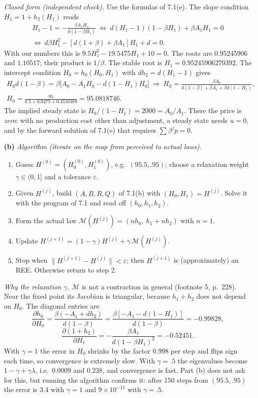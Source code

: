\documentclass[12pt, letterpaper]{article}
\begin{document}
\begin{tcolorbox}[evenbox,title={Exercise 7.2 \quad Rational expectations}]
\emph{Closed form (independent check).} Use the formulas of 7.1(e). The slope condition
$H_1=1+h_2(H_1)$ reads
\[
\begin{gathered}
H_1-1=-\frac{\beta A_1H_1}{d(1-\beta H_1)}
\ \Longleftrightarrow\ d(H_1-1)(1-\beta H_1)+\beta A_1H_1=0\\
\Longleftrightarrow\ d\beta H_1^2-[d(1+\beta)+\beta A_1]H_1+d=0 .
\end{gathered}
\]
With our numbers this is $9.5H_1^2-19.5475H_1+10=0$. The roots are $0.95245906$ and $1.10517$;
their product is $1/\beta$. The stable root is $H_1=0.95245906270392$. The intercept condition
$H_0=h_0(H_0,H_1)$ with $dh_2=d(H_1-1)$ gives
\[
\begin{gathered}
H_0d(1-\beta)=\beta\big[A_0-A_1H_0-d(1-H_1)H_0\big]
\ \Longrightarrow\
H_0=\frac{\beta A_0}{d(1-\beta)+\beta A_1+\beta d(1-H_1)},\\
H_0=\frac{95}{0.5+0.0475+0.4516389}=95.0818746 .
\end{gathered}
\]
The implied steady state is $H_0/(1-H_1)=2000=A_0/A_1$. There the price is \emph{zero}: with no
production cost other than adjustment, a steady state needs $u=0$, and by the forward solution of
7.1(e) that requires $\sum\beta^jp=0$.

\textbf{(b)} \emph{Algorithm (iterate on the map from perceived to actual laws).}
\begin{enumerate}[label=\arabic*.]
\item Guess $H^{(0)}=(H_0^{(0)},H_1^{(0)})$, e.g.\ $(95.5,.95)$; choose a relaxation weight
$\gamma\in(0,1]$ and a tolerance $\varepsilon$.
\item Given $H^{(j)}$, build $(A,B,R,Q)$ of 7.1(b) with $(H_0,H_1)=H^{(j)}$. Solve it with the
program of 7.1 and read off $(h_0,h_1,h_2)$.
\item Form the actual law $\mathcal M(H^{(j)})=(nh_0,\ h_1+nh_2)$ with $n=1$.
\item Update $H^{(j+1)}=(1-\gamma)H^{(j)}+\gamma\,\mathcal M(H^{(j)})$.
\item Stop when $\|H^{(j+1)}-H^{(j)}\|<\varepsilon$; then $H^{(j+1)}$ is (approximately) an REE.
Otherwise return to step 2.
\end{enumerate}
\emph{Why the relaxation $\gamma$.} $\mathcal M$ is not a contraction in general (footnote 5,
p.~228). Near the fixed point its Jacobian is triangular, because $h_1+h_2$ does not depend on $H_0$.
The diagonal entries are
\[
\frac{\partial h_0}{\partial H_0}=\frac{\beta(-A_1+dh_2)}{d(1-\beta)}=\frac{\beta[-A_1-d(1-H_1)]}{d(1-\beta)}=-0.99828,
\]
\[
\frac{\partial(1+h_2)}{\partial H_1}=-\frac{\beta A_1}{d(1-\beta H_1)^2}=-0.52451 .
\]
With $\gamma=1$ the error in $H_0$ shrinks by the factor $0.998$ per step and flips sign each time,
so convergence is extremely slow. With $\gamma=.5$ the eigenvalues become $1-\gamma+\gamma\lambda$,
i.e.\ $0.0009$ and $0.238$, and convergence is fast. Part (b) does not ask for this, but running the
algorithm confirms it: after 150 steps from $(95.5,.95)$ the error is $3.4$ with $\gamma=1$ and
$9\times10^{-11}$ with $\gamma=.5$.


\end{tcolorbox}
\end{document}
